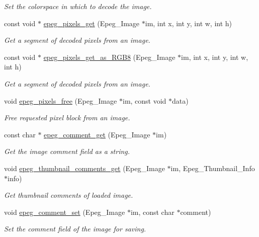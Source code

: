 \begin{DoxyCompactItemize}
\begin{DoxyCompactList}\small\item\em Set the colorspace in which to decode the image. \end{DoxyCompactList}\item 
const void $\ast$ \hyperlink{epeg_8c_acf990fda661066b46bbf470830288c78}{epeg\+\_\+pixels\+\_\+get} (Epeg\+\_\+\+Image $\ast$im, int x, int y, int w, int h)
\begin{DoxyCompactList}\small\item\em Get a segment of decoded pixels from an image. \end{DoxyCompactList}\item 
const void $\ast$ \hyperlink{epeg_8c_ac1d79775e08f47098507ac265581bf63}{epeg\+\_\+pixels\+\_\+get\+\_\+as\+\_\+\+R\+G\+B8} (Epeg\+\_\+\+Image $\ast$im, int x, int y, int w, int h)
\begin{DoxyCompactList}\small\item\em Get a segment of decoded pixels from an image. \end{DoxyCompactList}\item 
void \hyperlink{epeg_8c_adf9efc5d877afebda99aba8d5c2bbb0f}{epeg\+\_\+pixels\+\_\+free} (Epeg\+\_\+\+Image $\ast$im, const void $\ast$data)
\begin{DoxyCompactList}\small\item\em Free requested pixel block from an image. \end{DoxyCompactList}\item 
const char $\ast$ \hyperlink{epeg_8c_acf6013949f1cf3b4b5fc7f086fdaabaa}{epeg\+\_\+comment\+\_\+get} (Epeg\+\_\+\+Image $\ast$im)
\begin{DoxyCompactList}\small\item\em Get the image comment field as a string. \end{DoxyCompactList}\item 
void \hyperlink{epeg_8c_a28e230b7b3bb05b8a470c80c45100c52}{epeg\+\_\+thumbnail\+\_\+comments\+\_\+get} (Epeg\+\_\+\+Image $\ast$im, Epeg\+\_\+\+Thumbnail\+\_\+\+Info $\ast$info)
\begin{DoxyCompactList}\small\item\em Get thumbnail comments of loaded image. \end{DoxyCompactList}\item 
void \hyperlink{epeg_8c_ab96605b1c21ec8d791df705a5117233c}{epeg\+\_\+comment\+\_\+set} (Epeg\+\_\+\+Image $\ast$im, const char $\ast$comment)
\begin{DoxyCompactList}\small\item\em Set the comment field of the image for saving. \end{DoxyCompactList}\item 

\end{DoxyCompactItemize}
